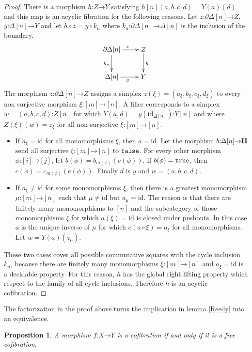 \documentclass{amsart}
\theoremstyle{plain}
\newtheorem{prop}[theorem]{Proposition}
\theoremstyle{definition}
\newcommand\id{\mathrm{id}}
\newcommand\of{\mathord:}
\renewcommand\to{\mathord\rightarrow}
\newcommand\simplex\Delta
\newcommand\cycle{\partial\Delta}
\begin{document}
\begin{proof}
There is a morphism $h\of Z\to Y$ satisfying $h[n](a,b,c,d) = Y(a)(d)$ and this map is an acyclic fibration for the following reasons.
Let $z\of\cycle[n]\to Z$, $y\of\simplex[n]\to Y$ and let $h\circ z = y\circ k_n$ where $k_n\of\cycle[n]\to \simplex[n]$ is the inclusion of the boundary.
\[\xymatrix{
\cycle[n]\ar[d]_{k_n}\ar[r]^z & Z\ar[d]^h\\
\simplex[n]\ar[r]_{y} & Y
}\]
The morphism $z\of\cycle[n]\to Z$ assigns a simplex $z(\xi) = (a_\xi,b_\xi,c_\xi,d_\xi)$ to every non surjective morphism $\xi\of [m]\to[n]$.
A filler corresponds to a simplex $w=(a,b,c,d)\of Z[n]$ for which $Y(a,d) = y(\id_{\simplex[n]})\of Y[n]$ and where $Z(\xi)(w)=z_\xi$ for all non surjective $\xi\of [m]\to[n]$.
\begin{itemize}
\item If $a_\xi=\id$ for all monomorphisms $\xi$, then $a=\id$. Let the morphism $b\of \simplex[n]\to \LDMC$ send all surjective $\xi\of[m]\to[n]$ to $\mathtt{false}$. For every other morphism $\phi\of [i]\to [j]$, let $b(\phi) = b_{m(\phi)}(e(\phi))$. If $b(\phi)=\mathtt{true}$, then $c(\phi) = c_{m(\phi)}(e(\phi))$. Finally $d$ is $y$ and $w=(a,b,c,d)$.
\item If $a_\xi\neq \id$ for some monomorphisms $\xi$, then there is a greatest monomorphism $\mu\of [m]\to[n]$ such that $\mu\neq \id$ but $a_\mu=\id$. The reason is that there are finitely many monomorphisms to $[n]$ and the subcategory of those monomorphisms $\xi$ for which $a(\xi)=\id$ is closed under pushouts. In this case $a$ is the unique inverse of $\mu$ for which $e(a\circ \xi) = a_\xi$ for all monomorphisms. Let $w = Y(a)(z_\mu)$.
\end{itemize}

These two cases cover all possible commutative squares with the cycle inclusion $k_n$, because there are finitely many monomorphisms $\xi\of [m]\to [n]$ and $a_\xi = \id$ is a decidable property. For this reason, $h$ has the global right lifting property which respect to the family of all cycle inclusions. Therefore $h$ is an acyclic cofibration.
\end{proof} %

The factorization in the proof above turns the implication in lemma \ref{Reedy} into an equivalence.

\begin{prop} A morphism $f\of X\to Y$ is a cofibration if and only if it is a free cofibration. \label{cofibration characterization} \end{prop}
\end{document}
